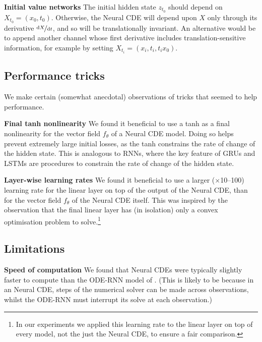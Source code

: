 \documentclass{article}
\theoremstyle{plain}
\theoremstyle{definition}
\newcommand{\ttfrac}[2]{\nicefrac{#1}{#2}}
\newcommand{\boldheading}[1]{

\textbf{#1}\quad}
\begin{document}
	\boldheading{Initial value networks}
	The initial hidden state $z_{t_0}$ should depend on $X_{t_0} = (x_0, t_0)$. Otherwise, the Neural CDE will depend upon $X$ only through its derivative $\ttfrac{\mathrm{d}X}{\mathrm{d}t}$, and so will be translationally invariant. An alternative would be to append another channel whose first derivative includes translation-sensitive information, for example by setting $X_{t_i} = (x_i, t_i, t_i x_0)$.
	
	\subsection{Performance tricks}
	We make certain (somewhat anecdotal) observations of tricks that seemed to help performance.
	
	\boldheading{Final tanh nonlinearity}
	We found it beneficial to use a tanh as a final nonlinearity for the vector field $f_\theta$ of a Neural CDE model. Doing so helps prevent extremely large initial losses, as the tanh constrains the rate of change of the hidden state. This is analogous to RNNs, where the key feature of GRUs and LSTMs are procedures to constrain the rate of change of the hidden state.
	
	\boldheading{Layer-wise learning rates}
	We found it beneficial to use a larger ($\times$10--100) learning rate for the linear layer on top of the output of the Neural CDE, than for the vector field $f_\theta$ of the Neural CDE itself. This was inspired by the observation that the final linear layer has (in isolation) only a convex optimisation problem to solve.\footnote{In our experiments we applied this learning rate to the linear layer on top of every model, not the just the Neural CDE, to ensure a fair comparison.}
	
	
	\subsection{Limitations} \label{section:limitations}
	\boldheading{Speed of computation}
	We found that Neural CDEs were typically slightly faster to compute than the ODE-RNN model of \cite{latent-odes}. (This is likely to be because in an Neural CDE, steps of the numerical solver can be made across observations, whilst the ODE-RNN must interrupt its solve at each observation.)
	
\end{document}
